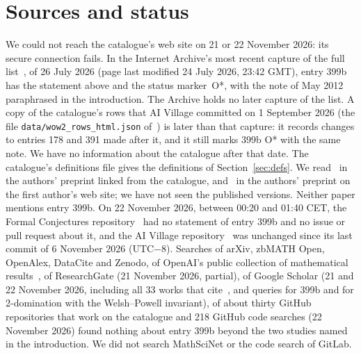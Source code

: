\documentclass[11pt,a4paper]{article}
\theoremstyle{definition}
\theoremstyle{remark}
\begin{document}
\section*{Sources and status}

We could not reach the catalogue's web site on 21 or 22 November 2026: its secure connection
fails. In the Internet Archive's most recent capture of the full list~\cite{wowii}, of 26 July 2026
(page last modified 24 July 2026, 23:42 GMT), entry 399b has the statement above and the status marker~O*,
with the note of May 2012 paraphrased in the introduction. The Archive holds no later capture of
the list. A copy of the catalogue's rows that AI Village committed on 1 September 2026 (the file
\texttt{data/wow2\_rows\_html.json} of~\cite{aiv}) is later than that capture: it records changes
to entries 178 and 391 made after it, and it still marks 399b O* with the same note. We have no
information about the catalogue after that date. The catalogue's definitions file gives the
definitions of Section~\ref{sec:defs}. We read~\cite{dp12} in the authors' preprint
linked from the catalogue, and~\cite{dlpw} in the authors' preprint on the first author's web
site; we have not seen the published versions. Neither
paper mentions entry 399b. On 22 November 2026, between 00:20 and 01:40 CET, the Formal
Conjectures repository~\cite{fc} had no statement of entry 399b and no issue or pull request about
it, and the AI Village repository~\cite{aiv} was unchanged since its last commit of 6 November 2026
(UTC$-$8). Searches of arXiv, zbMATH Open, OpenAlex, DataCite and Zenodo, of OpenAI's public
collection of mathematical results~\cite{oai}, of ResearchGate (21 November 2026, partial), of
Google Scholar (21 and 22 November 2026, including all 33 works that cite~\cite{dlpw}, and queries
for 399b and for 2-domination with the Welsh--Powell invariant), of about thirty GitHub repositories
that work on the catalogue and 218 GitHub code searches (22 November 2026) found nothing about
entry 399b beyond the two studies named in the introduction. We did not search MathSciNet or the
code search of GitLab.
\end{document}
